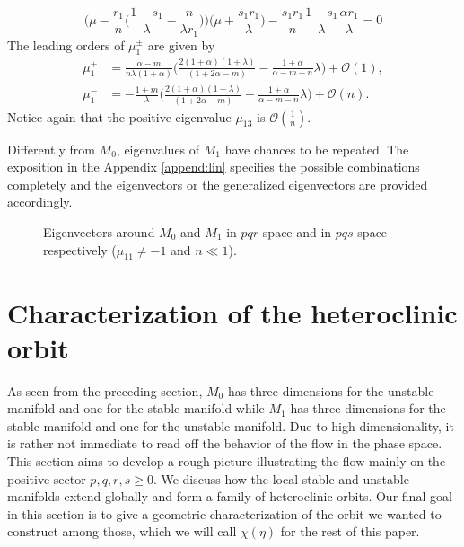 \documentclass[a4paper,11pt]{article}
\def\BO{{\mathcal{O}}}
\theoremstyle{remark}
\begin{document}
\begin{itemize}
 $$ \Big(\mu - \frac{r_1}{n}\Big(\frac{1-s_1}{\lambda}-\frac{n}{\lambda r_1}\Big)\Big)\Big(\mu + \frac{s_1r_1}{\lambda}\Big) - \frac{s_1r_1}{n} \frac{1-s_1}{\lambda}\frac{\alpha r_1}{\lambda} = 0$$
The leading orders of $\mu_1^\pm$ are given by
\begin{align*}
\mu_1^+ &= \frac{\alpha-m}{n\lambda(1+\alpha)}\Big(\frac{2(1+\alpha)(1+\lambda)}{(1+2\alpha-m) } - \frac{1+\alpha}{\alpha-m-n}\lambda\Big) + \BO(1), \\
\mu_1^- &= -\frac{1+m}{\lambda}\Big(\frac{2(1+\alpha)(1+\lambda)}{(1+2\alpha-m) } - \frac{1+\alpha}{\alpha-m-n}\lambda\Big) + \BO(n).
\end{align*}
Notice again that the positive eigenvalue $\mu_{13}$ is $\mathcal{O}( \frac{1}{n})$.

Differently from $M_0$, eigenvalues of $M_1$ have chances to be repeated. The exposition in the Appendix \ref{append:lin} specifies the possible combinations completely and the eigenvectors or the generalized eigenvectors are provided accordingly.
\end{itemize}
\begin{figure}
 \centering
  \subfigure[$pqr$-space]{
  \psfrag{r}{\scriptsize$r$}%
  \texttt{[image: equilibriapqr.eps]}\label{fig:eq1}
  }
  \quad \quad
  \subfigure[$pqs$-space]{
  \psfrag{r}{\scriptsize$s-\frac{1+m}{1+\alpha}$}%
  \texttt{[image: equilibriapqs.eps]}\label{fig:eq2}
  }
  \caption{Eigenvectors around $M_0$ and $M_1$ in $pqr$-space and in $pqs$-space respectively ($\mu_{11}\ne-1$ and $n\ll1$). } \label{fig:equilibria}
\end{figure}

\section{Characterization of the heteroclinic orbit} \label{sec:char}
As seen from the preceding section, $M_0$ has three dimensions for the unstable manifold and one for the stable manifold while $M_1$ has three dimensions for the stable manifold and one for the unstable manifold. Due to high dimensionality, it is rather not immediate to read off the behavior of the flow in the phase space. This section aims to develop a rough picture illustrating the flow mainly on the positive sector $p,q,r,s \ge0$. We discuss how the local stable and unstable manifolds extend globally and form a family of heteroclinic orbits. Our final goal in this section is to give a geometric characterization of the orbit we wanted to construct among those, which we will call $\chi(\eta)$ for the rest of this paper.
\end{document}
